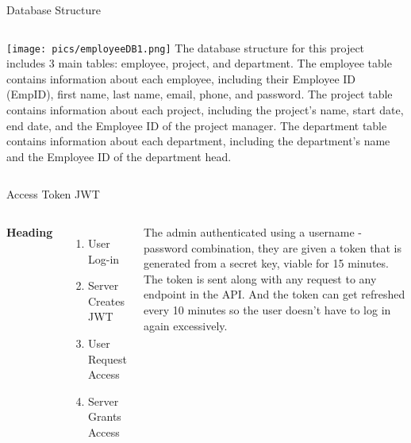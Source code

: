 \documentclass[aspectratio=169,xcolor=dvipsnames]{beamer}
\begin{document}
	
	\begin{frame}{Database Structure}
		\begin{columns}[c] %
			
			\texttt{[image: pics/employeeDB1.png]}
			The database structure for this project includes 3 main tables: employee, project, and department. The employee table contains information about each employee, including their Employee ID (EmpID), first name, last name, email, phone, and password. The project table contains information about each project, including the project's name, start date, end date, and the Employee ID of the project manager. The department table contains information about each department, including the department's name and the Employee ID of the department head.
			
		\end{columns}
	\end{frame}
	
	
	\begin{frame}{Access Token JWT}
		\begin{columns}[c] %
			
			\textbf{Heading}
			\begin{enumerate}
				\item User Log-in
				\item Server Creates JWT
				\item User Request Access
				\item Server Grants Access
			\end{enumerate}
			
			The admin authenticated using a username - password combination, they are given a token that is generated
			from a secret key, viable for 15 minutes. The token is sent along with any request to any
			endpoint in the API. And the token can get refreshed every 10 minutes so the user doesn't have to log in again excessively.
			
		\end{columns}
	\end{frame}
	
\end{document}
